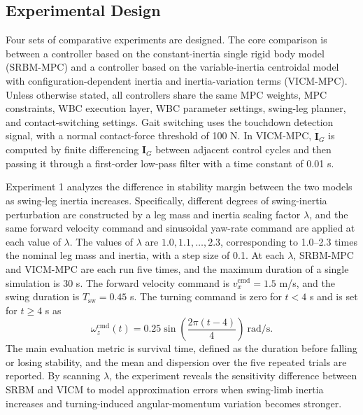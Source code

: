 \documentclass[5p,times]{elsarticle}
\begin{document}
\subsection{Experimental Design}
Four sets of comparative experiments are designed. The core comparison is between a controller based on the constant-inertia single rigid body model (SRBM-MPC) and a controller based on the variable-inertia centroidal model with configuration-dependent inertia and inertia-variation terms (VICM-MPC). Unless otherwise stated, all controllers share the same MPC weights, MPC constraints, WBC execution layer, WBC parameter settings, swing-leg planner, and contact-switching settings. Gait switching uses the touchdown detection signal, with a normal contact-force threshold of 100 N. In VICM-MPC, $\dot{\bm I}_G$ is computed by finite differencing $\bm I_G$ between adjacent control cycles and then passing it through a first-order low-pass filter with a time constant of 0.01 s.

Experiment 1 analyzes the difference in stability margin between the two models as swing-leg inertia increases. Specifically, different degrees of swing-inertia perturbation are constructed by a leg mass and inertia scaling factor $\lambda$, and the same forward velocity command and sinusoidal yaw-rate command are applied at each value of $\lambda$. The values of $\lambda$ are $1.0,1.1,\ldots,2.3$, corresponding to 1.0--2.3 times the nominal leg mass and inertia, with a step size of 0.1. At each $\lambda$, SRBM-MPC and VICM-MPC are each run five times, and the maximum duration of a single simulation is 30 s. The forward velocity command is $v_x^{\mathrm{cmd}}=1.5$ m/s, and the swing duration is $T_{\mathrm{sw}}=0.45$ s. The turning command is zero for $t<4$ s and is set for $t\ge4$ s as
\begin{equation}
\omega_z^{\mathrm{cmd}}(t)=0.25\sin\left(\frac{2\pi(t-4)}{4}\right)\ \mathrm{rad/s}.
\label{eq:exp_sine_wz}
\end{equation}
The main evaluation metric is survival time, defined as the duration before falling or losing stability, and the mean and dispersion over the five repeated trials are reported. By scanning $\lambda$, the experiment reveals the sensitivity difference between SRBM and VICM to model approximation errors when swing-limb inertia increases and turning-induced angular-momentum variation becomes stronger.
\end{document}
